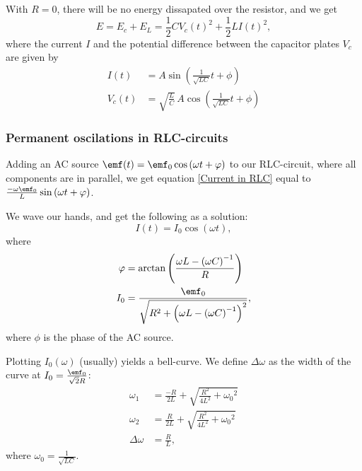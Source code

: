         With $R=0$, there will be no energy dissapated over the resistor, and we get 
        \begin{equation*}
            E = E_c + E_L = \frac{1}{2}C{V_c(t)}^2 + \frac{1}{2}L{I(t)}^2,
        \end{equation*}
        where the current $I$ and the potential difference between the capacitor plates $V_c$ are given by 
        \begin{align*}
            I(t) &= A\sin\left(\frac{1}{\sqrt{LC}}t + \phi\right) \\
            V_c (t) &= \sqrt{\frac{L}{C}} \, A\cos\left(\frac{1}{\sqrt{LC}}t + \phi\right)
        \end{align*}

    \subsubsection*{Permanent oscilations in RLC-circuits}

        Adding an AC source $\emf(t) = \emf_0\cos\left(\omega t + \phi\right)$ to our RLC-circuit, where all components are in parallel, 
        we get equation \eqref{Current in RLC} equal to $\frac{-\omega\emf_0}{L}\sin\left(\omega t + \phi\right)$.
        
        We wave our hands, and get the following as a solution: 
        \begin{equation}
            I(t) = I_0 \cos\left(\omega t\right),
        \end{equation}
        where 
        \begin{align*}
            \phi &= \text{arctan} \left(\frac{\omega L - \left(\omega C\right)^{-1}}{R}\right)\\
            I_0 &= \frac{\emf_0}{\sqrt{R^2 + \left(\omega L - \left(\omega C\right)^{-1}\right)^2}},
        \end{align*}
        where $\phi$ is the phase of the AC source.

        Plotting $I_0(\omega)$ (usually) yields a bell-curve. We define $\Delta\omega$ as the width of the curve at $I_0 = \frac{\emf_0}{\sqrt{2}R}$: 
        \begin{align*}
            \omega_1 &= \frac{-R}{2L} + \sqrt{\frac{R^2}{4L^2} + {\omega_0}^2}\\
            \omega_2 &= \frac{R}{2L} + \sqrt{\frac{R^2}{4L^2} + {\omega_0}^2}\\
            \Delta\omega &= \frac{R}{L},
        \end{align*}
        where $\omega_0 = \frac{1}{\sqrt{LC}}$.

